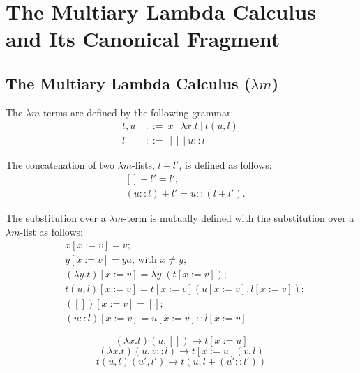 \chapter{The Multiary Lambda Calculus and Its Canonical Fragment }
\label{c:multiary}

\section{The Multiary Lambda Calculus ($\lambda m$)}

\begin{definition}
  The $\lambda m$-terms are defined by the following grammar:  
  \begin{align*} 
    t, u \ &::= \ x \ | \ \lambda x . t \ | \ t(u, l) \ \\
    l      &::= \ []\  | \ u :: l
  \end{align*}
\end{definition}

\begin{definition}
  The concatenation of two $\lambda m$-lists, $l + l'$, is defined as follows:
  \begin{align*}
  & [] + l' = l', \\
  & (u::l) + l' = u::(l + l').
  \end{align*}
\end{definition}

\begin{definition}
  The substitution over a $\lambda m$-term is mutually defined with the substitution over a $\lambda m$-list as follows:  
  \begin{align*}
  & x[x := v] = v ; \\
  & y[x := v] = ya \text{, with } x \neq y ; \\
  & (\lambda y . t)[x := v] = \lambda y . (t[x := v]) ; \\
  & t(u, l)[x := v] = t[x := v](u[x := v], l[x := v]) ; \\    
  & ([])[x := v] = [] ; \\ 
  & (u::l)[x := v] = u[x := v] :: l[x := v] .
  \end{align*}
\end{definition}

\begin{definition}  
  \[
    (\lambda x . t)(u, []) \to t[x := u]
    \label{eq:ruleb1} \tag{$\beta_1$}
  \]
  \[
    (\lambda x . t)(u, v::l) \to t[x := u](v, l)
    \label{eq:ruleb2} \tag{$\beta_2$}
  \]
  \[
    t(u, l)(u', l') \to t(u, l + (u'::l'))
    \label{eq:ruleh} \tag{$h$}
  \]
\end{definition}

